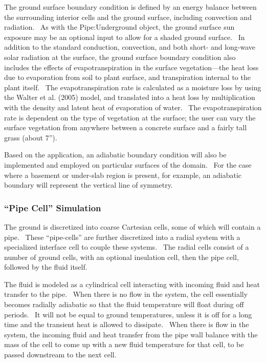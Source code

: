 The ground surface boundary condition is defined by an energy balance between the surrounding interior cells and the ground surface, including convection and radiation.~ As with the Pipe:Underground object, the ground surface sun exposure may be an optional input to allow for a shaded ground surface.~ In addition to the standard conduction, convection, and both short- and long-wave solar radiation at the surface, the ground surface boundary condition also includes the effects of evapotranspiration in the surface vegetation---the heat loss due to evaporation from soil to plant surface, and transpiration internal to the plant itself.~ The evapotranspiration rate is calculated as a moisture loss by using the Walter et al. (2005) model, and translated into a heat loss by multiplication with the density and latent heat of evaporation of water.~ The evapotranspiration rate is dependent on the type of vegetation at the surface; the user can vary the surface vegetation from anywhere between a concrete surface and a fairly tall grass (about 7'').

Based on the application, an adiabatic boundary condition will also be implemented and employed on particular surfaces of the domain.~ For the case where a basement or under-slab region is present, for example, an adiabatic boundary will represent the vertical line of symmetry.

\subsubsection{``Pipe Cell'' Simulation}\label{pipe-cell-simulation}

The ground is discretized into coarse Cartesian cells, some of which will contain a pipe.~ These ``pipe-cells'' are further discretized into a radial system with a specialized interface cell to couple these systems.~ The radial cells consist of a number of ground cells, with an optional insulation cell, then the pipe cell, followed by the fluid itself.

The fluid is modeled as a cylindrical cell interacting with incoming fluid and heat transfer to the pipe.~ When there is no flow in the system, the cell essentially becomes radially adiabatic so that the fluid temperature will float during off periods.~ It will not be equal to ground temperatures, unless it is off for a long time and the transient heat is allowed to dissipate.~ When there is flow in the system, the incoming fluid and heat transfer from the pipe wall balance with the mass of the cell to come up with a new fluid temperature for that cell, to be passed downstream to the next cell.

